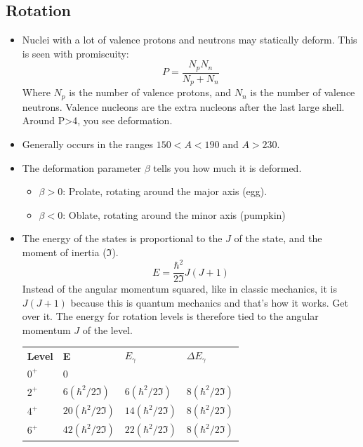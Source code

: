 \documentclass[letter]{article}
\begin{document}
\subsection{Rotation}
\begin{itemize}
\item Nuclei with a lot of valence protons and neutrons may statically
  deform. This is seen with promiscuity:
  \begin{equation*}
    P=\frac{N_pN_n}{N_p+N_n}
  \end{equation*}
Where $N_p$ is the number of valence protons, and $N_n$ is the number
of valence neutrons. Valence nucleons are the extra nucleons after the
last large shell. Around P>4, you see
deformation.~\cite[Lec. 13-16]{lecture}
\item Generally occurs in the ranges $150 < A < 190$ and $A > 230$.
\item The deformation parameter $\beta$ tells you how much it is
  deformed.~\cite[Lec. 13-16]{lecture}
  \begin{itemize}
  \item $\beta > 0$: Prolate, rotating around the major axis (egg).
  \item $\beta < 0$: Oblate, rotating around the minor axis (pumpkin)
  \end{itemize}
\item The energy of the states is proportional to the $J$ of the
  state, and the moment of inertia ($\Im$).
  \begin{equation*}
    E = \frac{\hbar^2}{2\Im}J(J+1)
  \end{equation*}
Instead of the angular momentum squared, like in classic mechanics, it
is $J(J+1)$ because this is quantum mechanics and that's how it
works. Get over it. The energy for rotation levels is therefore tied
to the angular momentum $J$ of the level.
\begin{table}[hbt]
\centering
\begin{tabular}{llll}
\textbf{Level} & \textbf{E}         & \textbf{$E_\gamma$}     & \textbf{$\Delta{}E_\gamma$} \\
$0^+$          & 0                  &                   &     \\
$2^+$          & $6(\hbar^2/2\Im)$  & $6(\hbar^2/2\Im)$ & $8(\hbar^2/2\Im)$    \\
$4^+$          & $20(\hbar^2/2\Im)$ & $14(\hbar^2/2\Im)$ & $8(\hbar^2/2\Im)$    \\
$6^+$          & $42(\hbar^2/2\Im)$ & $22(\hbar^2/2\Im)$ & $8(\hbar^2/2\Im)$                     \\

\end{tabular}
\end{table}
\end{itemize}
\end{document}
